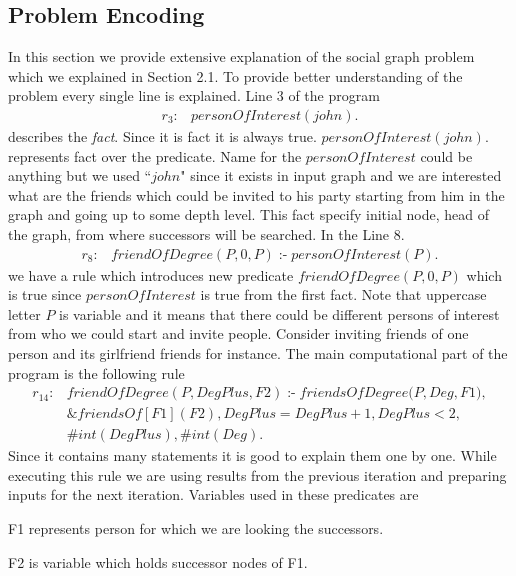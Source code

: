 \documentclass[14pt,a4paper, titlepage]{article}
\newcommand{\ext}[3]{\ensuremath{\&{#1}[#2](#3)}}
\DeclareMathOperator{\leftimpl}{:-}
\begin{document}
\subsection{Problem Encoding}
In this section we provide extensive explanation of the social graph problem which we explained in Section 2.1. 
To provide better understanding of the problem every single line is explained. Line 3 of the program 
\begin{align*}
r_3\colon& \mathit{personOfInterest}(\mathit{john}).
\end{align*} 
describes the \emph{fact}. Since it is fact it is always true. $\mathit{personOfInterest(\mathit{john}).}$ represents 
fact over the predicate. Name for the $\mathit{personOfInterest}$ could be anything but we used ``$\mathit{john}$" since 
it exists in input graph and we are interested what are the friends which could be invited to his party starting 
from him in the graph and going up to some depth level. This fact specify initial node, head of the graph, 
from where successors will be searched. In the Line 8.
\begin{align*}
r_8\colon& \mathit{friendOfDegree}(\mathit{P, 0, P}) \leftimpl \mathit{personOfInterest}(P).
\end{align*} 
 we have a rule which introduces new predicate $\mathit{friendOfDegree(P,0,P)}$ which is true since $\mathit{personOfInterest}$ is true from the first fact. Note that uppercase letter $P$ is variable and it means that there could be different persons of interest from who we could start and invite people. Consider inviting friends of one person and its girlfriend friends for instance. The main computational part of the program is the following rule   
\begin{align*}
r_{14}\colon& \mathit{friendOfDegree}(\mathit{P, DegPlus, F2}) \leftimpl \mathit{friendsOfDegree}(\mathit{P,Deg,F1)},\\
& \ext{friendsOf}{F1}{F2}, \mathit{DegPlus = DegPlus + 1}, \mathit{DegPlus < 2},\\
& \mathit{\#int(DegPlus)}, \mathit{\#int(Deg)}.
\end{align*} 
 Since it contains many statements it is good to explain them one by one. While executing this rule we are using results from the previous iteration and preparing inputs for the next iteration. Variables used in these predicates are


F1 represents person for which we are looking the successors.

F2 is variable which holds successor nodes of F1. 
\end{document}
